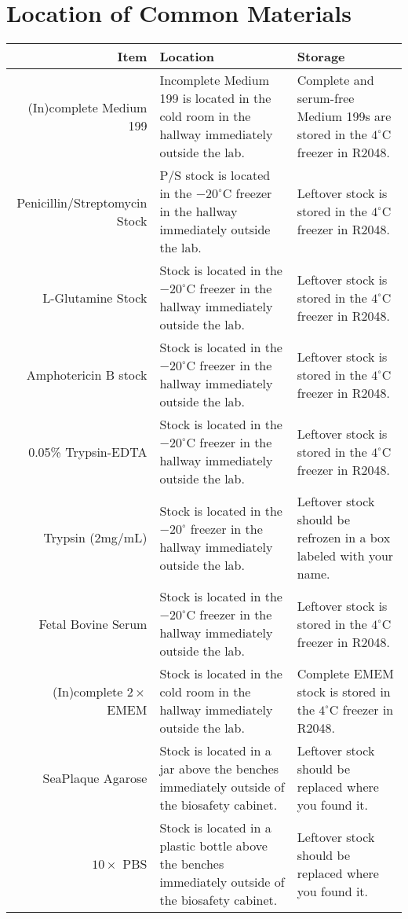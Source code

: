 
\section{Location of Common Materials}

\begin{tabular*}{\textwidth}{r | p{2in} p{2in}}
\hline
Item & Location & Storage \\
\hline
(In)complete Medium 199 & Incomplete Medium 199 is located in the cold room in the hallway immediately outside the lab. & Complete and serum-free Medium 199s are stored in the $4^{\circ}$C freezer in R2048.\\
Penicillin/Streptomycin Stock & P/S stock is located in the $-20^{\circ}$C freezer in the hallway immediately outside the lab. & Leftover stock is stored in the $4^{\circ}$C freezer in R2048.\\
L-Glutamine Stock & Stock is located in the $-20^{\circ}$C freezer in the hallway immediately outside the lab. & Leftover stock is stored in the $4^{\circ}$C freezer in R2048.\\
Amphotericin B stock & Stock is located in the $-20^{\circ}$C freezer in the hallway immediately outside the lab. & Leftover stock is stored in the $4^{\circ}$C freezer in R2048.\\
0.05\% Trypsin-EDTA & Stock is located in the $-20^{\circ}$C freezer in the hallway immediately outside the lab. & Leftover stock is stored in the $4^{\circ}$C freezer in R2048.\\
Trypsin ($2$mg/mL) & Stock is located in the $-20^{\circ}$ freezer in the hallway immediately outside the lab. & Leftover stock should be refrozen in a box labeled with your name.\\
Fetal Bovine Serum & Stock is located in the $-20^{\circ}$C freezer in the hallway immediately outside the lab. & Leftover stock is stored in the $4^{\circ}$C freezer in R2048.\\
(In)complete $2\times$ EMEM & Stock is located in the cold room in the hallway immediately outside the lab. & Complete EMEM stock is stored in the $4^{\circ}$C freezer in R2048.\\
SeaPlaque Agarose & Stock is located in a jar above the benches immediately outside of the biosafety cabinet. & Leftover stock should be replaced where you found it.\\
$10\times$ PBS & Stock is located in a plastic bottle above the benches immediately outside of the biosafety cabinet. & Leftover stock should be replaced where you found it. \\

\end{tabular*}
